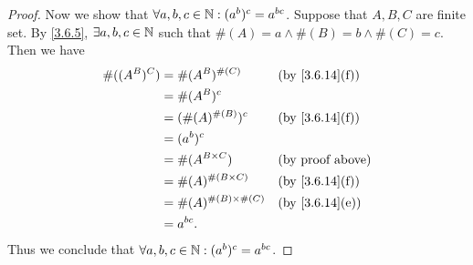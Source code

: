 \begin{proof}
	Now we show that \(\forall a, b, c \in \mathbb{N} : (a^b)^c = a^{bc}\).
	Suppose that \(A, B, C\) are finite set.
	By \cref{3.6.5}, \(\exists a, b, c \in \mathbb{N}\) such that \(\#(A) = a \land \#(B) = b \land \#(C) = c\).
	Then we have
	\begin{align*}
		\#((A^B)^C) & = \#(A^B)^{\#(C)}            &  & \text{(by \cref{3.6.14}(f))} \\
		            & = \#(A^B)^c                                                    \\
		            & = (\#(A)^{\#(B)})^c          &  & \text{(by \cref{3.6.14}(f))} \\
		            & = (a^b)^c                                                      \\
		            & = \#(A^{B \times C})         &  & \text{(by proof above)}      \\
		            & = \#(A)^{\#(B \times C)}     &  & \text{(by \cref{3.6.14}(f))} \\
		            & = \#(A)^{\#(B) \times \#(C)} &  & \text{(by \cref{3.6.14}(e))} \\
		            & = a^{bc}.
	\end{align*}
	Thus we conclude that \(\forall a, b, c \in \mathbb{N} : (a^b)^c = a^{bc}\).


\end{proof}
